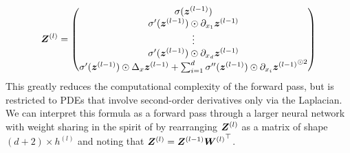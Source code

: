 \begin{align}
    {\bm{Z}}^{(l)}
    =
     \begin{pmatrix}
         \sigma({\bm{z}}^{(l-1)}) \\
         \sigma'({\bm{z}}^{(l-1)})\odot \partial_{x_1}{\bm{z}}^{(l-1)} \\
         \vdots \\
         \sigma'({\bm{z}}^{(l-1)})\odot \partial_{x_d}{\bm{z}}^{(l-1)} \\
         \sigma'({\bm{z}}^{(l-1)})\odot\Delta_x{\bm{z}}^{(l-1)} + \sum_{i=1}^d \sigma''({\bm{z}}^{(l-1)})\odot \partial_{x_i}{{\bm{z}}^{(l-1)}}^{\odot 2}
     \end{pmatrix}
     \label{eq:forward-laplacian-nonlinear-layer-compact}
\end{align}
This greatly reduces the computational complexity of the forward pass, but is restricted to PDEs that involve second-order derivatives only via the Laplacian. %
We can interpret this formula as a forward pass through a larger neural network with weight sharing in the spirit of \cite{eschenhagen2023kroneckerfactored}  by rearranging ${\bm{Z}}^{(l)}$ as a matrix of shape $(d+2)\times h^{(l)}$ and noting that ${\bm{Z}}^{(l)} = {\bm{Z}}^{(l-1)}{{\bm{W}}^{(l)}}^\top$.

